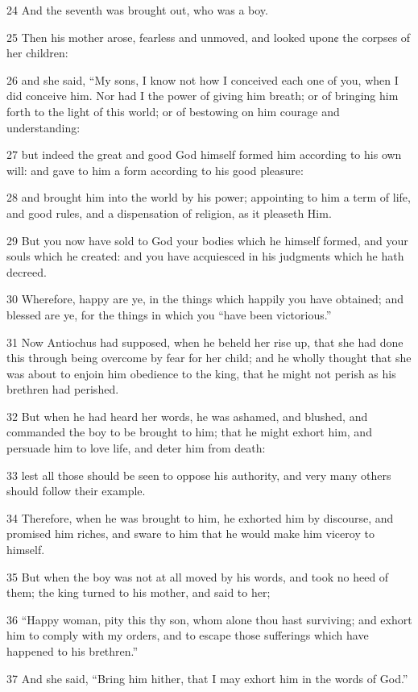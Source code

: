 24 And the seventh was brought out, who was a boy. 

25 Then his mother arose, fearless and unmoved, and looked upon¢ the corpses of her children: 

26 and she said, “My sons, I know not how I conceived each one of you, when I did conceive him. Nor had I the power of giving him breath; or of bringing him forth to the light of this world; or of bestowing on him courage and understanding: 

27 but indeed the great and good God himself formed him according to his own will: and gave to him a form according to his good pleasure: 

28 and brought him into the world by his power; appointing to him a term of life, and good rules, and a dispensation of religion, as it pleaseth Him. 

29 But you now have sold to God your bodies which he himself formed, and your souls which he created: and you have acquiesced in his judgments which he hath decreed. 

30 Wherefore, happy are ye, in the things which happily you have obtained; and blessed are ye, for the things in which you “have been victorious.” 

31 Now Antiochus had supposed, when he beheld her rise up, that she had done this through being overcome by fear for her child; and he wholly thought that she was about to enjoin him obedience to the king, that he might not perish as his brethren had perished. 

32 But when he had heard her words, he was ashamed, and blushed, and commanded the boy to be brought to him; that he might exhort him, and persuade him to love life, and deter him from death: 

33 lest all those should be seen to oppose his authority, and very many others should follow their example. 

34 Therefore, when he was brought to him, he exhorted him by discourse, and promised him riches, and sware to him that he would make him viceroy to himself. 

35 But when the boy was not at all moved by his words, and took no heed of them; the king turned to his mother, and said to her; 

36 “Happy woman, pity this thy son, whom alone thou hast surviving; and exhort him to comply with my orders, and to escape those sufferings which have happened to his brethren.” 

37 And she said, “Bring him hither, that I may exhort him in the words of God.” 

